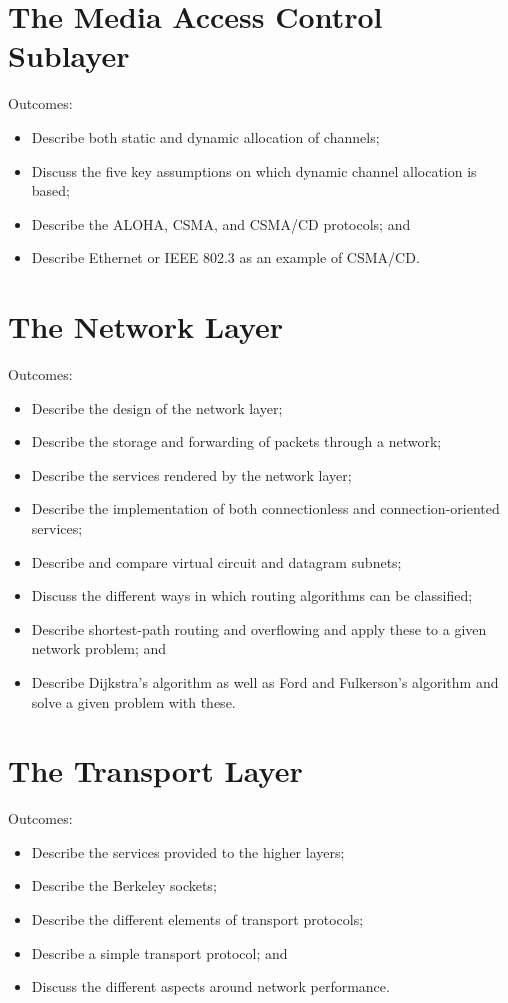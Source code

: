 \documentclass[a4paper, 12pt, titlepage]{report}
\begin{document}
\chapter{The Media Access Control Sublayer}
Outcomes:
\begin{itemize}
\item Describe both static and dynamic allocation of channels;
\item Discuss the five key assumptions on which dynamic channel allocation is based;
\item Describe the ALOHA, CSMA, and CSMA/CD protocols; and
\item Describe Ethernet or IEEE 802.3 as an example of CSMA/CD.
\end{itemize}
\chapter{The Network Layer}
Outcomes:
\begin{itemize}
\item Describe the design of the network layer;
\item Describe the storage and forwarding of packets through a network;
\item Describe the services rendered by the network layer;
\item Describe the implementation of both connectionless and connection-oriented services;
\item Describe and compare virtual circuit and datagram subnets;
\item Discuss the different ways in which routing algorithms can be classified;
\item Describe shortest-path routing and overflowing and apply these to a given network problem; and
\item Describe Dijkstra’s algorithm as well as Ford and Fulkerson’s algorithm and solve a given problem with these.
\end{itemize}
\chapter{The Transport Layer}
Outcomes:
\begin{itemize}
\item Describe the services provided to the higher layers;
\item Describe the Berkeley sockets;
\item Describe the different elements of transport protocols;
\item Describe a simple transport protocol; and
\item Discuss the different aspects around network performance.
\end{itemize}
\end{document}
